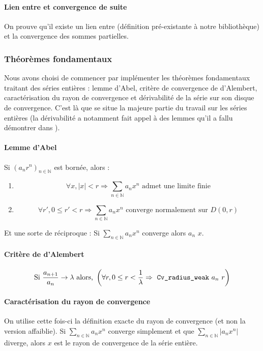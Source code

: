 \paragraph{Lien entre  et convergence de suite} On prouve qu'il existe un lien entre  (définition pré-existante à notre bibliothèque) et la convergence des sommes partielles.

\subsubsection{Théorèmes fondamentaux}

Nous avons choisi de commencer par implémenter les théorèmes fondamentaux traitant des séries entières : lemme d'Abel, critère de convergence de d'Alembert, caractérisation du rayon de convergence et dérivabilité de la série sur son disque de convergence. C'est là que se situe la majeure partie du travail sur les séries entières (la dérivabilité a notamment fait appel à des lemmes qu'il a fallu démontrer dans ).

\paragraph{Lemme d'Abel} Si $\left(a_n r^n\right)_{n\in \mathbb{N}}$ est bornée, alors :
\begin{enumerate}
 \item $$\forall x, |x| < r \Rightarrow \sum_{n\in \mathbb{N}} a_n x^n \text{ admet une limite finie}$$
 \item $$\forall r', 0 \le r' < r \Rightarrow \sum_{n\in \mathbb{N}} a_n x^n \text{ converge normalement sur } D\left(0,r\right)$$
\end{enumerate}

Et une sorte de réciproque : Si $\sum_{n\in \mathbb{N}} a_n x^n$ converge alors  $a_n$ $x$.

\paragraph{Critère de d'Alembert} $$\text{Si } \frac{a_{n + 1}}{a_n} \rightarrow \lambda \text{ alors, } \left( \forall r, 0 \le r < \frac{1}{\lambda} \Rightarrow \text{ \texttt{Cv\_radius\_weak} } a_n~ r\right)$$

\paragraph{Caractérisation du rayon de convergence} On utilise cette fois-ci la définition exacte du rayon de convergence (et non la version affaiblie). Si $\sum_{n\in \mathbb{N}} a_n x^n$ converge simplement et que $\sum_{n\in \mathbb{N}} |a_n x^n|$ diverge, alors $x$ est le rayon de convergence de la série entière.

